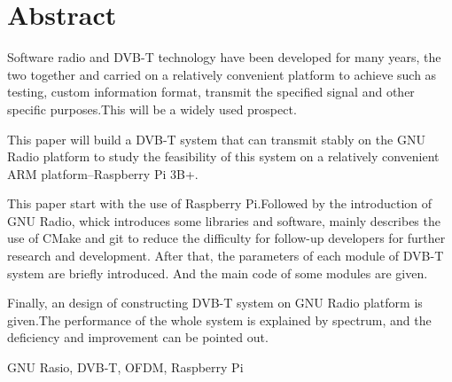 ﻿%
\renewcommand{\baselinestretch}{1.5}
\fontsize{12pt}{13pt}\selectfont

\chapter*{Abstract}

\par Software radio and DVB-T technology have been developed for many years, the two together and carried on a relatively convenient platform to achieve such as testing, custom information format, transmit the specified signal and other specific purposes.This will be a widely used prospect.
\par This paper will build a DVB-T system that can transmit stably on the GNU Radio platform to study the feasibility of this system on a relatively convenient ARM platform--Raspberry Pi 3B+.
\par This paper start with the use of Raspberry Pi.Followed by the introduction of GNU Radio, whick introduces some libraries and software, mainly describes the use of CMake and git to reduce the difficulty for follow-up developers for further research and development. After that, the parameters of each module of DVB-T system are briefly introduced. And the main code of some modules are given. 
\par Finally, an design of constructing DVB-T system on GNU Radio platform is given.The performance of the whole system is explained by spectrum, and the deficiency and improvement can be pointed out.


\vspace{1em}
 \quad GNU Rasio, DVB-T, OFDM, Raspberry Pi

\clearpage
\endinput